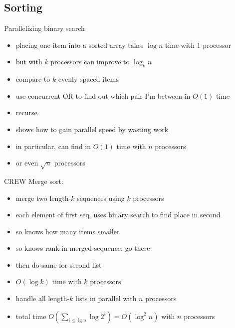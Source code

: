 \documentclass[12pt]{article}
\begin{document}
\subsection*{Sorting}



Parallelizing binary search
\begin{itemize}
\item placing one item into a sorted array takes $\log n$ time with 1
  processor
\item but with $k$ processors can improve to $\log_k n$
\item compare to $k$ evenly spaced items
\item use concurrent OR to find out which pair I'm between in $O(1)$ time
\item recurse
\item shows how to gain parallel speed by wasting work
\item in particular, can find in $O(1)$ time with $n$ processors
\item or even $\sqrt{n}$ processors
\end{itemize}


CREW Merge sort:
\begin{itemize}
\item merge two length-$k$ sequences using $k$ processors
\item each element of first seq. uses binary search to find place in
  second
\item so knows how many items smaller
\item so knows rank in merged sequence: go there
\item then do same for second list
\item $O(\log k)$ time with $k$ processors
\item handle all length-$k$ lists in parallel with $n$ processors
\item total time $O(\sum_{i \le \lg n} \log 2^i)=O(\log^2 n)$ with $n$ processors
\end{itemize}
\end{document}
